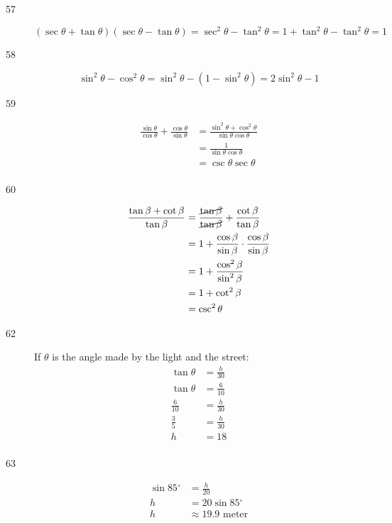 \documentclass[fleqn,addpoints]{exam}
\newcommand{\degree}{\ensuremath{^\circ}}
\begin{document}
\begin{description}
\item[57]
\[
  (\sec \theta + \tan \theta)(\sec \theta - \tan \theta) = \sec^2 \theta - \tan^2 \theta = 1 + \tan^2 \theta - \tan^2 \theta = 1
\]

\item[58]
\[
  \sin^2 \theta - \cos^2 \theta = \sin^2 \theta - (1 - \sin^2 \theta) = 2 \sin^2 \theta - 1
\]

\item[59]
\begin{align*}
  \frac{\sin \theta}{\cos \theta} + \frac{\cos \theta}{\sin \theta} &= \frac{\sin^2 \theta + \cos^2 \theta}{\sin \theta \cos \theta} \\
  &= \frac{1}{\sin \theta \cos \theta} \\
  &= \csc \theta \sec \theta \\
\end{align*}

\item[60]
\begin{align*}
  \frac{\tan \beta + \cot \beta}{\tan \beta} &= \frac{\cancel{\tan \beta}}{\cancel{\tan \beta}} + \frac{\cot \beta}{\tan \beta} \\
  &= 1 + \frac{\cos \beta}{\sin \beta} \cdot \frac{\cos \beta}{\sin \beta} \\
  &= 1 + \frac{\cos^2 \beta}{\sin^2 \beta} \\
  &= 1 + \cot^2 \beta \\
  &= \csc^2 \theta
\end{align*}

\item[62]

If $\theta$ is the angle made by the light and the street:
\begin{align*}
  \tan \theta &= \frac{h}{30} \\
  \tan \theta &= \frac{6}{10} \\
  \frac{6}{10} &= \frac{h}{30} \\
  \frac{3}{5} &= \frac{h}{30} \\
  h &= 18 \\
\end{align*}

\item[63]
\begin{align*}
  \sin 85 \degree &= \frac{h}{20} \\
  h &= 20 \sin 85 \degree \\
  h &\approx 19.9 \text{ meter} \\
\end{align*}


\end{description}
\end{document}
